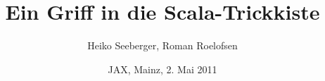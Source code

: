 \documentclass{beamer}
\title{Ein Griff in die Scala-Trickkiste}
\author{Heiko Seeberger, Roman Roelofsen}
\institute{WeigleWilczek}
\date{JAX, Mainz, 2. Mai 2011}
\begin{document}
\begin{frame}
\titlepage
\end{frame}


 
\end{document}
